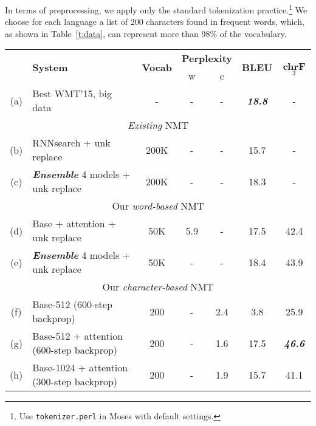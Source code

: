 \documentclass[11pt]{article}
\newcommand{\bi}[1]{\textbf{\textit{#1}}}
\newcommand{\rare}{$<${\it rare}$>$}
\newcommand{\chr}{chrF$_3$}
\begin{document}
In terms of preprocessing, we apply only the standard tokenization practice.\footnote{Use \texttt{tokenizer.perl} in Moses with
default settings.} We choose for each language a list of 200
characters found in frequent words, which, as shown in Table~\ref{t:data}, can
represent more than 98\% of the vocabulary. 


\begin{table*}%
\centering
\begin{tabular}{c|l|c|c|c|c|c}
 & \multirow{2}{*}{\bf{System}} & \multirow{2}{*}{{\bf
 Vocab}} &
\multicolumn{2}{c|}{{\bf Perplexity}} &\multirow{ 2}{*}{\bf{BLEU}} &\multirow{
2}{*}{\bf{\chr{}}}\\
\cline{4-5}
& & & w & c & & \\
  \hline
(a) & Best WMT'15, big data \cite{bojar15wmt} & %
- & - & - & \bi{18.8} & - \\
  \hline
\multicolumn{7}{c}{{\it Existing} NMT}\\
  \hline
(b) & RNNsearch + unk replace \cite{jean15wmt} & 200K & - & - & 15.7 & - \\
(c) & \bi{Ensemble} 4 models + unk replace \cite{jean15wmt} & 200K & - & - & 18.3 & - \\
  \hline
\multicolumn{7}{c}{Our {\it word-based} NMT}\\
  \hline
(d) & Base + attention + unk replace & 50K & 5.9 & - & 17.5 & 42.4 \\
(e) & \bi{Ensemble} 4 models + unk replace & 50K & - & - & 18.4 & 43.9 \\
  \hline
\multicolumn{7}{c}{Our {\it character-based} NMT}\\
  \hline
(f) & Base-512 (600-step backprop) & 200 & - & 2.4 & 3.8 & 25.9\\
(g) & Base-512 + attention (600-step backprop) & 200 & - & 1.6 & 17.5 &
\bi{46.6} \\
  \hdashline
(h) & Base-1024 + attention (300-step backprop) & 200 & - & 1.9 & 15.7 & 41.1 \\
  \hline

\end{tabular}
\end{table*}
\end{document}

